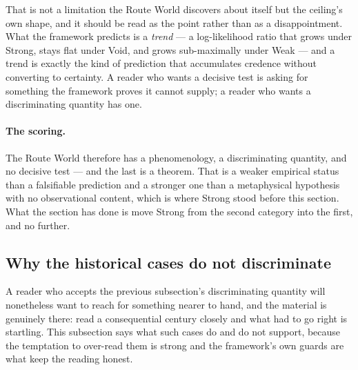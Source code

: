 \documentclass[11pt]{article}
\numberwithin{equation}{section}
\theoremstyle{plain}
\theoremstyle{definition}
\theoremstyle{remark}
\begin{document}
That is not a limitation the Route World discovers about itself but the
ceiling's own shape, and it should be read as the point rather than as a
disappointment. What the framework predicts is a \emph{trend} --- a
log-likelihood ratio that grows under Strong, stays flat under Void, and
grows sub-maximally under Weak --- and a trend is exactly the kind of
prediction that accumulates credence without converting to certainty. A
reader who wants a decisive test is asking for something the framework
proves it cannot supply; a reader who wants a discriminating quantity has
one.

\paragraph{The scoring.} The Route World therefore has a phenomenology, a
discriminating quantity, and no decisive test --- and the last is a
theorem. That is a weaker empirical status than a falsifiable prediction
and a stronger one than a metaphysical hypothesis with no observational
content, which is where Strong stood before this section. What the
section has done is move Strong from the second category into the first,
and no further.

\subsection{Why the historical cases do not discriminate}
\label{gc:sub:historicalcases}

A reader who accepts the previous subsection's discriminating quantity
will nonetheless want to reach for something nearer to hand, and the
material is genuinely there: read a consequential century closely and
what had to go right is startling. This subsection says what such cases
do and do not support, because the temptation to over-read them is
strong and the framework's own guards are what keep the reading honest.
\end{document}
